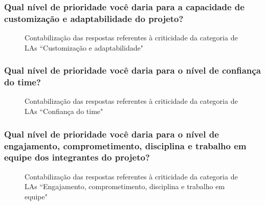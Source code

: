 \subsubsection{Qual nível de prioridade você daria para a capacidade de customização e adaptabilidade do projeto?}

\begin{figure}[H]
	\centering
	\captionsetup{justification=centering}
	\caption{Contabilização das respostas referentes à criticidade da categoria de LAs ``Customização e adaptabilidade"}
	\label{fig:result-adaptabilidade}
\end{figure}

\subsubsection{Qual nível de prioridade você daria para o nível de confiança do time?}

\begin{figure}[H]
	\centering
	\captionsetup{justification=centering}
	\caption{Contabilização das respostas referentes à criticidade da categoria de LAs ``Confiança do time"}
	\label{fig:result-confianca}
\end{figure}

\subsubsection{Qual nível de prioridade você daria para o nível de engajamento, comprometimento, disciplina e trabalho em equipe dos integrantes do projeto?}

\begin{figure}[H]
	\centering
	\captionsetup{justification=centering}
	\caption{Contabilização das respostas referentes à criticidade da categoria de LAs ``Engajamento, comprometimento, disciplina e trabalho em equipe"}
	\label{fig:result-engajamento}
\end{figure}

